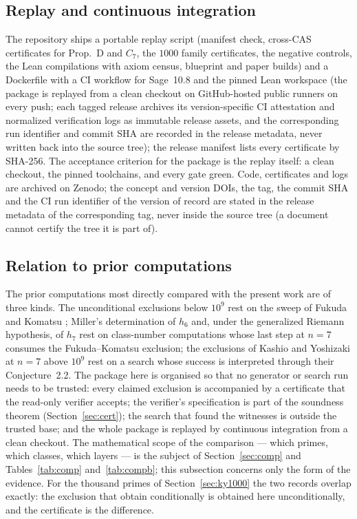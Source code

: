 \documentclass[11pt]{amsart}
\theoremstyle{remark}\newtheorem{remark}[theorem]{Remark}
\theoremstyle{definition}\newtheorem{definition}[theorem]{Definition}
\theoremstyle{definition}\newtheorem{algorithm}[theorem]{Algorithm}
\begin{document}
\subsection{Replay and continuous integration}
The repository ships a portable replay script (manifest check, cross-CAS certificates for Prop.~D and $C_7$, the $1000$ family certificates, the negative controls, the Lean compilations with axiom census, blueprint and paper builds) and a Dockerfile with a CI workflow for Sage~10.8 and the pinned Lean workspace (the package is replayed from a clean checkout on GitHub-hosted public runners on every push; each tagged release archives its version-specific CI attestation and normalized verification logs as immutable release assets, and the corresponding run identifier and commit SHA are recorded in the release metadata, never written back into the source tree); the release manifest lists every certificate by SHA-256. The acceptance criterion for the package is the replay itself: a clean checkout, the pinned toolchains, and every gate green. Code, certificates and logs are archived on Zenodo; the concept and version DOIs, the tag, the commit SHA and the CI run identifier of the version of record are stated in the release metadata of the corresponding tag, never inside the source tree (a document cannot certify the tree it is part of).

\subsection{Relation to prior computations}
The prior computations most directly compared with the present work are of three kinds. The unconditional exclusions below $10^9$ rest on the sweep of Fukuda and Komatsu \cite{FK3}; Miller's determination of $h_6$ and, under the generalized Riemann hypothesis, of $h_7$ \cite{Mi} rest on class-number computations whose last step at $n=7$ consumes the Fukuda--Komatsu exclusion; the exclusions of Kashio and Yoshizaki at $n=7$ above $10^9$ \cite{KY} rest on a search whose success is interpreted through their Conjecture~2.2. The package here is organised so that no generator or search run needs to be trusted: every claimed exclusion is accompanied by a certificate that the read-only verifier accepts; the verifier's specification is part of the soundness theorem (Section~\ref{sec:cert}); the search that found the witnesses is outside the trusted base; and the whole package is replayed by continuous integration from a clean checkout. The mathematical scope of the comparison --- which primes, which classes, which layers --- is the subject of Section~\ref{sec:comp} and Tables~\ref{tab:comp} and~\ref{tab:compb}; this subsection concerns only the form of the evidence. For the thousand primes of Section~\ref{sec:ky1000} the two records overlap exactly: the exclusion that \cite{KY} obtain conditionally is obtained here unconditionally, and the certificate is the difference.
\end{document}
